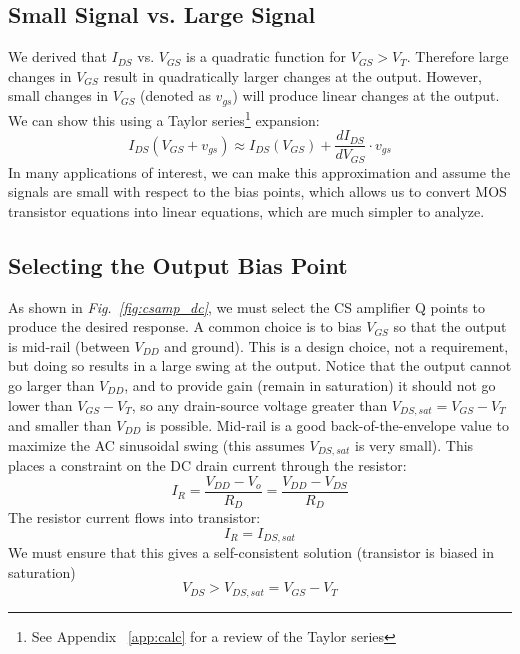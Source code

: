 \subsection{Small Signal vs. Large Signal}
We derived that $I_{DS}$ vs. $V_{GS}$ is a quadratic function for $V_{GS} > V_T$.  Therefore large changes in $V_{GS}$ result in quadratically larger changes at the output.  However, small changes in $V_{GS}$ (denoted as $v_{gs}$) will produce linear changes at the output.  We can show this using a Taylor series\footnote{See Appendix ~\ref{app:calc} for a review of the Taylor series} expansion:
    \begin{equation}
        {I_{DS}(V_{GS} + v_{gs})} \approx I_{DS} {(V_{GS})} + \frac{dI_{DS}}{dV_{GS}} \cdot v_{gs}  
    \end{equation}
In many applications of interest, we can make this approximation and assume the signals are small with respect to the bias points, which allows us to convert MOS transistor equations into linear equations, which are much simpler to analyze.
\subsection{Selecting the Output Bias Point}
As shown in \emph{Fig.~\ref{fig:csamp_dc}}, we must select the CS amplifier Q points to produce the desired response.  A common choice is to bias $V_{GS}$ so that the output is mid-rail (between $V_{DD}$ and ground).  This is a design choice, not a requirement, but doing so results in a large swing at the output.  Notice that the output cannot go larger than $V_{DD}$, and to provide gain (remain in saturation) it should not go lower than $V_{GS}-V_T$, so any drain-source voltage greater than $V_{DS,sat} = V_{GS}-V_T$ and smaller than $V_{DD}$ is possible.  Mid-rail is a good back-of-the-envelope value to maximize the AC sinusoidal swing (this assumes $V_{DS,sat}$ is very small).  This places a constraint on the DC drain current through the resistor:
    \begin{equation}
        {I_R} = \frac{{{V_{DD}} - {V_o}}}{{{R_D}}} = \frac{{{V_{DD}} - {V_{DS}}}}{{{R_D}}}
    \end{equation}
The resistor current flows into transistor:
    \begin{equation}
        {I_R} = {I_{DS,sat}}
    \end{equation}
We must ensure that this gives a self-consistent solution (transistor is biased in saturation)
    \begin{equation}
        {V_{DS}} > V_{DS,sat} = {V_{GS}} - {V_T}
    \end{equation}

